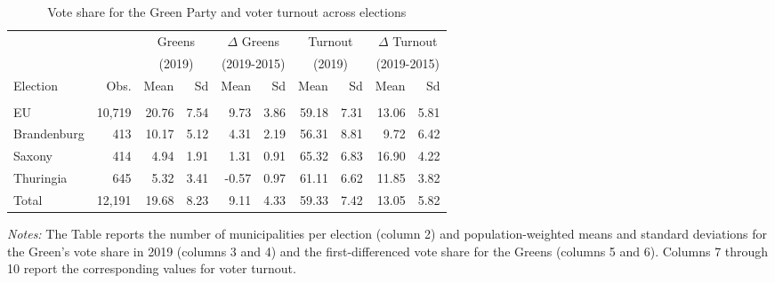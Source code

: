 
	\begin{table}[t]\centering
		\begin{threeparttable}
			\caption{Vote share for the Green Party and voter turnout across elections}
			\label{tab_greta_cons:data_greens_vote_share}
			\begin{tabular}{l*{9}{r}}
				\toprule
				&&\multicolumn{2}{c}{Greens}&\multicolumn{2}{c}{$\Delta$ Greens}&\multicolumn{2}{c}{Turnout}&\multicolumn{2}{c}{$\Delta$ Turnout}\\
				&&\multicolumn{2}{c}{(2019)}&\multicolumn{2}{c}{(2019-2015)}&\multicolumn{2}{c}{(2019)}&\multicolumn{2}{c}{(2019-2015)}\\
				\cmidrule(lr){3-4}\cmidrule(lr){5-6}\cmidrule(lr){7-8}\cmidrule(lr){9-10}
				Election		&	Obs.	&	Mean		&	Sd		&	Mean	& Sd	&	Mean	&	Sd		&	Mean	& Sd		\\
				\midrule\\
				EU				&	10,719	&	20.76		&	7.54	&	9.73	& 3.86	&	59.18	&	7.31	&	13.06	&	5.81	\\
				Brandenburg		&	413		&	10.17		&	5.12	&	4.31	& 2.19	&	56.31	&	8.81	&	9.72	&	6.42	\\
				Saxony			&	414		&	4.94		&	1.91	&	1.31	& 0.91	&	65.32	&	6.83	&	16.90	&	4.22	\\
				Thuringia		&	645		&	5.32		&	3.41	&	-0.57	& 0.97	&	61.11	&	6.62	&	11.85	&	3.82	\\
				\midrule
				Total			&	12,191	&	19.68		&	8.23	&	9.11	& 4.33	&	59.33	&	7.42	&	13.05	&	5.82	\\
				\bottomrule
			\end{tabular}
			\begin{tablenotes} 
				\item \scriptsize \emph{Notes:} The Table reports the number of municipalities per election (column 2) and population-weighted means and standard deviations for the Green's vote share in 2019 (columns 3 and 4) and the first-differenced vote share for the Greens (columns 5 and 6). Columns 7 through 10 report the corresponding values for voter turnout. 
			\end{tablenotes} 
		\end{threeparttable}
	\end{table}

